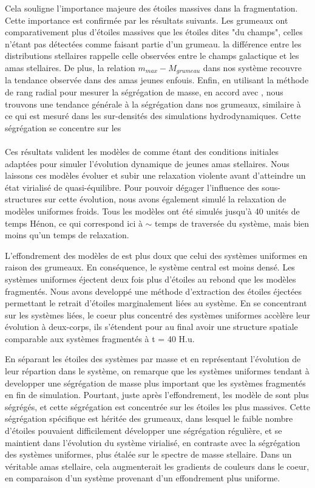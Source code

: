Cela souligne l'importance majeure des étoiles massives dans la fragmentation. Cette importance est confirmée par les résultats suivants. Les grumeaux ont comparativement plus d'étoiles massives que les étoiles dites "du champs", celles n'étant pas détectées comme faisant partie d'un grumeau. la différence entre les distributions stellaires rappelle celle observées entre le champs galactique et les amas stellaires. De plus, la relation  $m_{max} - M_{grumeau}$ dans nos système recouvre la tendance observée dans des amas jeunes enfouis. Enfin, en utilisant la méthode de rang radial pour mesurer la ségrégation de masse, en accord avec \cite{Maschberger2010}, nous trouvons une tendance générale à la ségrégation dans nos grumeaux, similaire à ce qui est mesuré dans les sur-densités des simulations hydrodynamiques. Cette ségrégation se concentre sur les

\paragraph*{}
Ces résultats valident les modèles de \HubLem comme étant des conditions initiales adaptées pour simuler l'évolution dynamique de jeunes amas stellaires. Nous laissons ces modèles évoluer et subir une relaxation violente avant d'atteindre un état virialisé de quasi-équilibre. Pour pouvoir dégager l'influence des sous-structures sur cette évolution, nous avons également simulé la relaxation de modèles uniformes froids. Tous les modèles ont été simulés jusqu'à 40 unités de temps H\'enon, ce qui correspond ici à $\sim$ temps de traversée du système, mais bien moins qu'un temps de relaxation.

L'effondrement des modèles de \HubLem est plus doux que celui des systèmes uniformes en raison des grumeaux. En conséquence, le système central est moins densé. Les systèmes uniformes éjectent deux fois plus d'étoiles au rebond que les modèles fragmentés. Nous avons developpé une méthode d'extraction des étoiles éjectées permettant le retrait d'étoiles marginalement liées au système. En se concentrant sur les systèmes liées, le coeur plus concentré des systèmes uniformes accèlère leur évolution à deux-corps, ils s'étendent pour au final avoir une structure spatiale comparable aux systèmes fragmentés à t = 40 H.u.

En séparant les étoiles des systèmes par masse et en représentant l'évolution de leur répartion dans le système, on remarque que les systèmes uniformes tendant à developper une ségrégation de masse plus important que les systèmes fragmentés en fin de simulation. Pourtant, juste après l'effondrement, les modèle de \HubLem sont plus ségrégés, et cette ségrégation est concentrée sur les étoiles les plus massives. Cette ségrégation spécifique est héritée des grumeaux, dans lesquel le faible nombre d'étoiles pouvaient difficilement développer une ségrégation régulière, et se maintient dans l'évolution du système virialisé, en contraste avec la ségrégation des systèmes uniformes, plus étalée sur le spectre de masse stellaire. Dans un véritable amas stellaire, cela augmenterait les gradients de couleurs dans le coeur, en comparaison d'un système provenant d'un effondrement plus uniforme.



